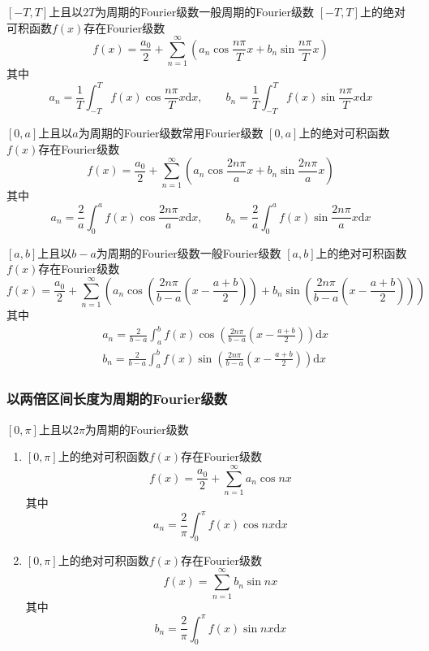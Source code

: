 \documentclass[lang = cn, scheme = chinese, thmcnt = section]{elegantbook}
\newcommand{\dd}{\mathrm{d}}           %
\begin{document}
\begin{theorem}{$[-T,T]$上且以$2T$为周期的Fourier级数}{一般周期的Fourier级数}
	$[-T,T]$上的绝对可积函数$f(x)$存在Fourier级数%
	$$
	f(x)=\frac{a_0}{2}+\sum_{n=1}^{\infty}\left(a_n\cos \frac{n\pi}{T}x+b_n\sin \frac{n\pi}{T}x\right)
	$$
	其中%
	$$
	a_n=\frac{1}{T}\int_{-T}^{T}f(x)\cos \frac{n\pi}{T} x\dd x,\qquad 
	b_n=\frac{1}{T}\int_{-T}^{T}f(x)\sin \frac{n\pi}{T} x\dd x
	$$
\end{theorem}

\begin{theorem}{$[0,a]$上且以$a$为周期的Fourier级数}{常用Fourier级数}
	$[0,a]$上的绝对可积函数$f(x)$存在Fourier级数
	$$
	f(x)=\frac{a_0}{2}+\sum_{n=1}^{\infty}
	\left(
	a_n\cos\frac{2n\pi}{a}x
	+b_n\sin\frac{2n\pi}{a}x
	\right)
	$$
	其中%
	$$
	a_n=\frac{2}{a}\int_{0}^{a}f(x)\cos\frac{2n\pi}{a}x\dd x,\qquad
	b_n=\frac{2}{a}\int_{0}^{a}f(x)\sin\frac{2n\pi}{a}x\dd x
	$$
\end{theorem}

\begin{theorem}{$[a,b]$上且以$b-a$为周期的Fourier级数}{一般Fourier级数}
	$[a,b]$上的绝对可积函数$f(x)$存在Fourier级数%
	$$
	f(x)=\frac{a_0}{2}+\sum_{n=1}^{\infty}
	\left(
	a_n\cos \left(\frac{2n\pi}{b-a}\left(x-\frac{a+b}{2}\right)\right)
	+b_n\sin \left(\frac{2n\pi}{b-a}\left(x-\frac{a+b}{2}\right)\right)
	\right)
	$$
	其中
	\begin{align*}
		& a_n=\frac{2}{b-a}\int_{a}^{b}f(x)\cos \left(\frac{2n\pi}{b-a}\left(x-\frac{a+b}{2}\right)\right)\dd x\\
		& b_n=\frac{2}{b-a}\int_{a}^{b}f(x)\sin \left(\frac{2n\pi}{b-a}\left(x-\frac{a+b}{2}\right)\right)\dd x
	\end{align*}
\end{theorem}

\subsubsection{以两倍区间长度为周期的Fourier级数}

\begin{theorem}{$[0,\pi]$上且以$2\pi$为周期的Fourier级数}
	\begin{enumerate}
		\item $[0,\pi]$上的绝对可积函数$f(x)$存在Fourier级数
		$$
		f(x)=\frac{a_0}{2}+\sum_{n=1}^{\infty}a_n\cos nx
		$$
		其中%
		$$
		a_n=\frac{2}{\pi}\int_{0}^{\pi}f(x)\cos n x\dd x
		$$
		\item $[0,\pi]$上的绝对可积函数$f(x)$存在Fourier级数
		$$
		f(x)=\sum_{n=1}^{\infty}b_n\sin nx
		$$
		其中%
		$$
		b_n=\frac{2}{\pi}\int_{0}^{\pi}f(x)\sin n x\dd x
		$$
	\end{enumerate}
\end{theorem}
\end{document}
